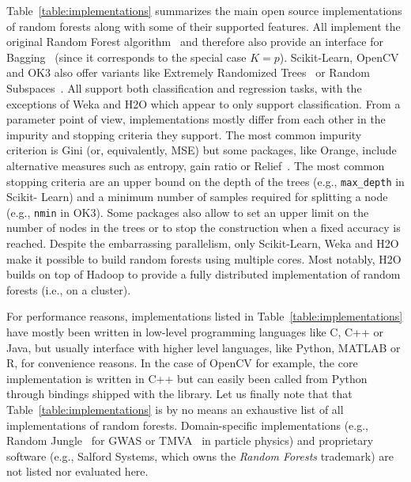 Table~\ref{table:implementations} summarizes the main open source
implementations of random forests along with some of their supported features.
All implement the original Random Forest algorithm~\citep{breiman:2001} and
therefore also provide an interface for Bagging~\citep{breiman:1996b} (since it
corresponds to the special case $K=p$). Scikit-Learn, OpenCV and OK3 also offer
variants like Extremely Randomized Trees~\citep{geurts:2006} or Random
Subspaces~\citep{ho:1998}. All support both classification and regression
tasks, with the exceptions of Weka and H2O which appear to only support
classification. From a parameter point of view, implementations mostly differ
from each other in the impurity and stopping criteria they support. The most
common impurity criterion is Gini (or, equivalently, MSE) but some packages,
like Orange, include alternative measures such as entropy, gain
ratio or Relief~\citep{kira:1992}. The most common stopping criteria are an
upper bound on the depth of the trees (e.g., \texttt{max\_depth} in Scikit-
Learn) and a minimum number of samples required for splitting a node (e.g.,
\texttt{nmin} in OK3). Some packages also allow to set an upper limit on the
number of nodes in the trees or to stop the construction when a fixed accuracy
is reached. Despite the embarrassing parallelism, only Scikit-Learn, Weka and
H2O make it possible to build random forests using multiple cores. Most
notably, H2O builds on top of Hadoop to provide a fully distributed
implementation of random forests  (i.e., on a cluster).

For performance reasons, implementations listed in
Table~\ref{table:implementations} have mostly been written in low-level
programming languages like C, C++ or Java, but usually interface with higher
level languages, like Python, MATLAB or R, for convenience reasons. In the case
of OpenCV for example, the core implementation is written in C++ but can easily
been called from Python through bindings shipped with the library. Let us
finally note that that Table~\ref{table:implementations} is by no means an
exhaustive list of all implementations of random forests. Domain-specific
implementations (e.g., Random Jungle~\citep{schwarz:2010} for GWAS or TMVA~\citep{hoecker:2007} in particle physics) and
proprietary software (e.g., Salford Systems, which owns the
\textit{Random Forests} trademark) are not listed nor evaluated here.

